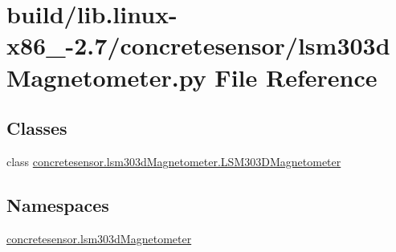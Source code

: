 \hypertarget{build_2lib_8linux-x86__64-2_87_2concretesensor_2lsm303dMagnetometer_8py}{}\section{build/lib.linux-\/x86\+\_-\/2.7/concretesensor/lsm303d\+Magnetometer.py File Reference}
\label{build_2lib_8linux-x86__64-2_87_2concretesensor_2lsm303dMagnetometer_8py}
\subsection*{Classes}
\begin{DoxyCompactItemize}
\item 
class \hyperlink{classconcretesensor_1_1lsm303dMagnetometer_1_1LSM303DMagnetometer}{concretesensor.\+lsm303d\+Magnetometer.\+L\+S\+M303\+D\+Magnetometer}
\end{DoxyCompactItemize}
\subsection*{Namespaces}
\begin{DoxyCompactItemize}
\item 
 \hyperlink{namespaceconcretesensor_1_1lsm303dMagnetometer}{concretesensor.\+lsm303d\+Magnetometer}
\end{DoxyCompactItemize}
